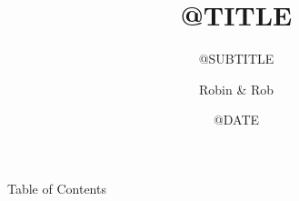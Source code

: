 \documentclass[10pt]{beamer}
\title{@TITLE}
\subtitle{@SUBTITLE}
\author[R. Aggleton]{Robin \& Rob}
\date{@DATE}
\begin{document}
\begin{frame}[plain]
  \titlepage
\end{frame}

\begin{frame}{Table of Contents}
    \begin{multicols}{2}
        \tableofcontents
    \end{multicols}
\end{frame}


\end{document}
